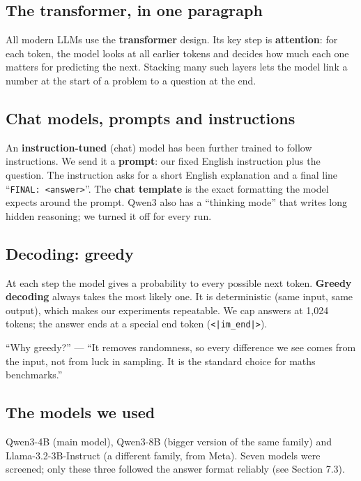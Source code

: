 \documentclass[11pt,a4paper]{article}
\begin{document}
\subsection{The transformer, in one paragraph}
All modern LLMs use the \textbf{transformer} design. Its key step is \textbf{attention}: for each token, the model looks at all earlier tokens and decides how much each one matters for predicting the next. Stacking many such layers lets the model link a number at the start of a problem to a question at the end.

\subsection{Chat models, prompts and instructions}
An \textbf{instruction-tuned} (chat) model has been further trained to follow instructions. We send it a \textbf{prompt}: our fixed English instruction plus the question. The instruction asks for a short English explanation and a final line ``\texttt{FINAL: <answer>}''. The \textbf{chat template} is the exact formatting the model expects around the prompt. Qwen3 also has a ``thinking mode'' that writes long hidden reasoning; we turned it off for every run.

\subsection{Decoding: greedy}
At each step the model gives a probability to every possible next token. \textbf{Greedy decoding} always takes the most likely one. It is deterministic (same input, same output), which makes our experiments repeatable. We cap answers at 1{,}024 tokens; the answer ends at a special end token (\texttt{<|im\_end|>}).

\begin{ifasked}
``Why greedy?'' --- ``It removes randomness, so every difference we see comes from the input, not from luck in sampling. It is the standard choice for maths benchmarks.''
\end{ifasked}

\subsection{The models we used}
Qwen3-4B (main model), Qwen3-8B (bigger version of the same family) and Llama-3.2-3B-Instruct (a different family, from Meta). Seven models were screened; only these three followed the answer format reliably (see Section 7.3).
\end{document}
